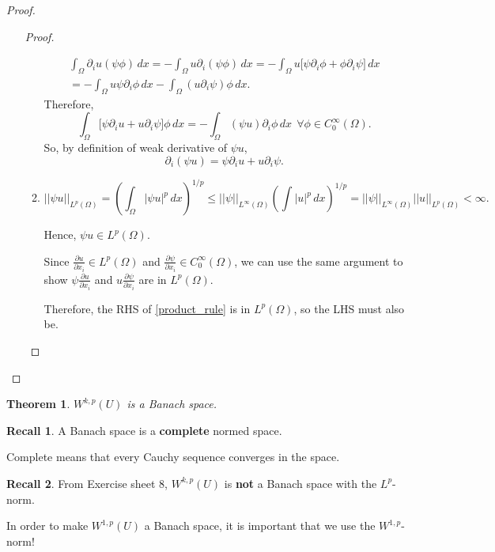 \documentclass[12pt]{article}
\newtheorem{theorem}{Theorem}[section]
\theoremstyle{definition}
\newtheorem*{recall}{Recall}
\begin{document}
\begin{proof}
\begin{enumerate}[label=(\roman*)]
\begin{proof}
\begin{enumerate}[label=(\alph*)]
\begin{multline*}
\int_{\Omega}\partial_iu(\psi\phi)\,dx=-\int_{\Omega}u\partial_i(\psi\phi)\,dx=-\int_{\Omega}u\big[\psi\partial_i\phi+\phi\partial_i\psi\big]\,dx\\
=-\int_{\Omega}u\psi\partial_i\phi\,dx-\int_{\Omega}(u\partial_i\psi)\phi\,dx.
\end{multline*}
Therefore,
\[\int_{\Omega}\big[\psi\partial_iu+u\partial_i\psi\big]\phi\,dx=-\int_{\Omega}(\psi u)\partial_i\phi\,dx\ \ \forall\phi\in C_0^{\infty}(\Omega).\]
So, by definition of weak derivative of $\psi u$,
\begin{equation}\tag{$*$}\label{product_rule}
\partial_i(\psi u)=\psi\partial_iu+u\partial_i\psi.
\end{equation}

\setcounter{enumii}{0}
\item
\[||\psi u||_{L^p(\Omega)}=\left(\int_{\Omega}|\psi u|^p\,dx\right)^{1/p}\leq||\psi||_{L^{\infty}(\Omega)}\left(\int|u|^p\,dx\right)^{1/p}=||\psi||_{L^{\infty}(\Omega)}||u||_{L^p(\Omega)}<\infty.\]

Hence, $\psi u\in L^p(\Omega)$.

Since $\frac{\partial u}{\partial x_i}\in L^p(\Omega)$ and $\frac{\partial\psi}{\partial x_i}\in C_0^{\infty}(\Omega)$, we can use the same argument to show $\psi\frac{\partial u}{\partial x_i}$ and $u\frac{\partial\psi}{\partial x_i}$ are in $L^p(\Omega)$.

Therefore, the RHS of \eqref{product_rule} is in $L^p(\Omega)$, so the LHS must also be.
\end{enumerate}
\end{proof}
\end{enumerate}
\end{proof}

\begin{theorem}\label{Sobolev_Banach}
$W^{k,p}(U)$ is a Banach space.
\end{theorem}

\begin{recall}
A Banach space is a \textbf{complete} normed space.

Complete means that every Cauchy sequence converges in the space.
\end{recall}

\begin{recall}
From Exercise sheet 8, $W^{k,p}(U)$ is \textbf{not} a Banach space with the $L^p$-norm.

In order to make $W^{1,p}(U)$ a Banach space, it is important that we use the $W^{1,p}$-norm!
\end{recall}
\end{document}
